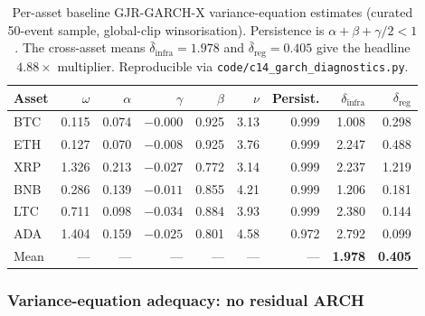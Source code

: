 \documentclass[pdflatex,sn-mathphys-num]{sn-jnl}
\theoremstyle{thmstyleone}
\theoremstyle{thmstyletwo}
\theoremstyle{thmstylethree}
\begin{document}
\begin{table}[htbp]
\centering
\caption{Per-asset baseline GJR-GARCH-X variance-equation estimates (curated 50-event sample, global-clip winsorisation). Persistence is $\alpha+\beta+\gamma/2<1$. The cross-asset means $\bar\delta_{\text{infra}}=1.978$ and $\bar\delta_{\text{reg}}=0.405$ give the headline $4.88\times$ multiplier. Reproducible via \texttt{code/c14\_garch\_diagnostics.py}.}\label{tab:garch_params}
\small
\begin{tabular}{@{}lrrrrrrrr@{}}
\toprule
\textbf{Asset} & \boldmath$\omega$ & \boldmath$\alpha$ & \boldmath$\gamma$ & \boldmath$\beta$ & \boldmath$\nu$ & \textbf{Persist.} & \boldmath$\delta_{\text{infra}}$ & \boldmath$\delta_{\text{reg}}$ \\
\midrule
BTC & 0.115 & 0.074 & $-0.000$ & 0.925 & 3.13 & 0.999 & 1.008 & 0.298 \\
ETH & 0.127 & 0.070 & $-0.008$ & 0.925 & 3.76 & 0.999 & 2.247 & 0.488 \\
XRP & 1.326 & 0.213 & $-0.027$ & 0.772 & 3.14 & 0.999 & 2.237 & 1.219 \\
BNB & 0.286 & 0.139 & $-0.011$ & 0.855 & 4.21 & 0.999 & 1.206 & 0.181 \\
LTC & 0.711 & 0.098 & $-0.034$ & 0.884 & 3.93 & 0.999 & 2.380 & 0.144 \\
ADA & 1.404 & 0.159 & $-0.025$ & 0.801 & 4.58 & 0.972 & 2.792 & 0.099 \\
\midrule
Mean & --- & --- & --- & --- & --- & --- & \textbf{1.978} & \textbf{0.405} \\
\bottomrule
\end{tabular}
\end{table}

\subsubsection{Variance-equation adequacy: no residual ARCH}\label{sec:garch_diagnostics}
\end{document}

